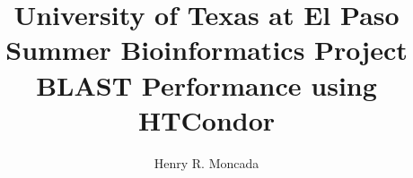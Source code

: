 \documentclass{article}
\begin{document}
\title{University of Texas at El Paso\\
Summer Bioinformatics Project\\
BLAST Performance using HTCondor}
\vspace{.5pc}
\author{Henry R. Moncada}
\maketitle
\tableofcontents        %


\end{document}
